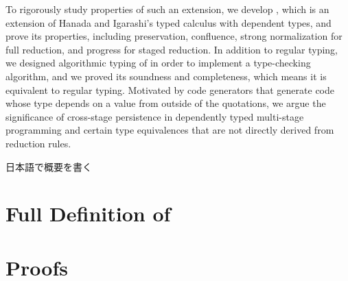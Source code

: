 \documentclass[master,english]{kuisthesis}
\begin{document}
\begin{eabstract}


To rigorously study properties of such an extension, we develop \LMD, which is
    an extension of Hanada and Igarashi's typed calculus \LTP with dependent
    types, and prove its properties, including preservation, confluence, strong
    normalization for full reduction, and progress for staged reduction. In
    addition to regular typing, we designed algorithmic typing of \LMD in order
    to implement a type-checking algorithm, and we proved its soundness and
    completeness, which means it is equivalent to regular typing. Motivated by
    code generators that generate code whose type depends on a value from
    outside of the quotations, we argue the significance of cross-stage
    persistence in dependently typed multi-stage programming and certain type
    equivalences that are not directly derived from reduction rules. 


\end{eabstract}

\begin{jabstract}				%
日本語で概要を書く
\end{jabstract}

\tableofcontents				%


















\iffullversion
\appendix

\newtheorem{dfn}{Definition}
\newtheorem{ex}{Example}
\newtheorem{cm}{Comment}
\newcommand{\figheader}[2]{
  \begin{flushleft}
    #2 {\bf \normalsize #1}
\end{flushleft}}

\newpage
\section{Full Definition of \LMD}


\section{Proofs}


\fi
\end{document}
